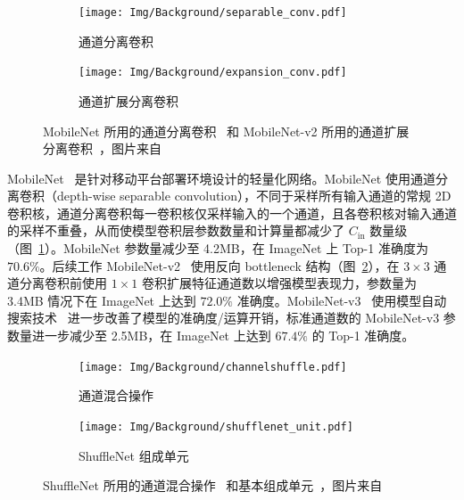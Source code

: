 \begin{figure}[htb]
  \centering
  \begin{subfigure}[t]{0.4\columnwidth}
    \centering
    \texttt{[image: Img/Background/separable\_conv.pdf]}
    \caption{通道分离卷积}
    \label{img::background::separable_conv}
  \end{subfigure}
  \quad
  \begin{subfigure}[t]{0.5\columnwidth}
    \centering
    \texttt{[image: Img/Background/expansion\_conv.pdf]}
    \caption{通道扩展分离卷积}
    \label{img::background::expansion_conv}
  \end{subfigure}
  \caption{MobileNet 所用的通道分离卷积~ 和 MobileNet-v2 所用的通道扩展分离卷积~，图片来自~\citet{Sandler_2018}}
  \label{img::background::mobile_nets}
\end{figure}

MobileNet~\citep{howard2017mobilenets} 是针对移动平台部署环境设计的轻量化网络。MobileNet 使用通道分离卷积（depth-wise separable convolution），不同于采样所有输入通道的常规 2D 卷积核，通道分离卷积每一卷积核仅采样输入的一个通道，且各卷积核对输入通道的采样不重叠，从而使模型卷积层参数数量和计算量都减少了 $C_{\mathrm{in}}$ 数量级（图~\ref{img::background::separable_conv}）。MobileNet 参数量减少至 4.2MB，在 ImageNet 上 Top-1 准确度为 $70.6\%$。后续工作 MobileNet-v2~\citep{Sandler_2018} 使用反向 bottleneck 结构（图~\ref{img::background::expansion_conv}），在 $3\times 3$ 通道分离卷积前使用 $1\times 1$ 卷积扩展特征通道数以增强模型表现力，参数量为 3.4MB 情况下在 ImageNet 上达到 $72.0\%$ 准确度。MobileNet-v3~\citep{howard2019searching} 使用模型自动搜索技术~\citep{zoph2018learning} 进一步改善了模型的准确度/运算开销，标准通道数的 MobileNet-v3 参数量进一步减少至 2.5MB，在 ImageNet 上达到 $67.4\%$ 的 Top-1 准确度。

\begin{figure}[htb]
  \centering
  \begin{subfigure}[t]{0.45\columnwidth}
    \centering
    \texttt{[image: Img/Background/channelshuffle.pdf]}
    \caption{通道混合操作}
    \label{img::background::channel_shuffle}
  \end{subfigure}
  \quad
  \begin{subfigure}[t]{0.45\columnwidth}
    \centering
    \texttt{[image: Img/Background/shufflenet\_unit.pdf]}
    \caption{ShuffleNet 组成单元}
    \label{img::background::shufflenet_unit}
  \end{subfigure}
  \caption{ShuffleNet 所用的通道混合操作~ 和基本组成单元~，图片来自~\citet{zhang2018shufflenet}}
  \label{img::background::shuffle_net}
\end{figure}

